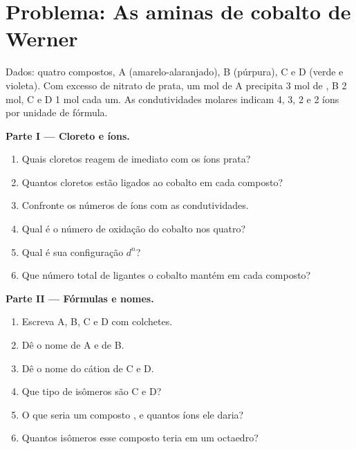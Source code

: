 \section{Problema: As aminas de cobalto de Werner}

\begin{problem}
\label{pb:b2:coordination-complexes:1}
Dados: quatro compostos, A  (amarelo-alaranjado), B 
(púrpura), C e D  (verde e violeta). Com excesso de nitrato de
prata, um mol de A precipita 3 mol de , B 2 mol, C e D 1 mol cada um.
As condutividades molares indicam 4, 3, 2 e 2 íons por unidade de fórmula.

\medskip
\noindent\textbf{Parte I --- Cloreto e íons.}
\begin{enumerate}
  \item Quais cloretos reagem de imediato com os íons prata?
  \item Quantos cloretos estão ligados ao cobalto em cada composto?
  \item Confronte os números de íons com as condutividades.
  \item Qual é o número de oxidação do cobalto nos quatro?
  \item Qual é sua configuração $d^n$?
  \item Que número total de ligantes o cobalto mantém em cada composto?
\end{enumerate}

\medskip
\noindent\textbf{Parte II --- Fórmulas e nomes.}
\begin{enumerate}[resume]
  \item Escreva A, B, C e D com colchetes.
  \item Dê o nome de A e de B.
  \item Dê o nome do cátion de C e D.
  \item Que tipo de isômeros são C e D?
  \item O que seria um composto , e quantos íons ele daria?
  \item Quantos isômeros esse composto teria em um octaedro?
\end{enumerate}


\end{problem}

